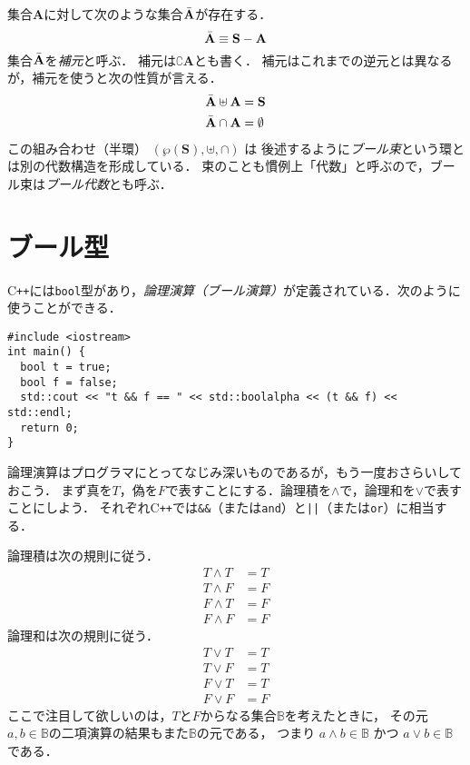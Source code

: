 \documentclass{jsbook}
\newcommand{\cxx}{\textrm{C}\texttt{++}}
\newcommand{\ccode}[1]{\texttt{#1}}
\newcommand{\keyword}[1]{\emph{#1}}
\newcommand{\bg}[1]{\mathbf{#1}}
\begin{document}
集合$\bg{A}$に対して次のような集合$\Bar{\bg{A}}$が存在する．
\begin{equation}
\Bar{\bg{A}}\equiv\bg{S}-\bg{A}
\end{equation}
集合$\Bar{\bg{A}}$を\keyword{補元}と呼ぶ．
補元は$\complement\bg{A}$とも書く．
補元はこれまでの逆元とは異なるが，補元を使うと次の性質が言える．
\begin{align}
\Bar{\bg{A}}\uplus\bg{A}&=\bg{S}\\
\Bar{\bg{A}}\cap\bg{A}&=\emptyset
\end{align}
この組み合わせ（半環） $(\wp(\bg{S}),\uplus,\cap)$ は
後述するように\keyword{ブール束}という環とは別の代数構造を形成している．
束のことも慣例上「代数」と呼ぶので，ブール束は\keyword{ブール代数}とも呼ぶ．

\section{ブール型}

\cxx には\ccode{bool}型があり，\keyword{論理演算（ブール演算）}が定義されている．次のように使うことができる．
\begin{verbatim}
#include <iostream>
int main() {
  bool t = true;
  bool f = false;
  std::cout << "t && f == " << std::boolalpha << (t && f) << std::endl;
  return 0;
}
\end{verbatim}

論理演算はプログラマにとってなじみ深いものであるが，もう一度おさらいしておこう．
まず真を$T$，偽を$F$で表すことにする．論理積を$\wedge$で，論理和を$\vee$で表すことにしよう．
それぞれ\cxx では\ccode{\&\&}（または\ccode{and}）と\ccode{||}（または\ccode{or}）に相当する．

論理積は次の規則に従う．
\begin{align}
T\wedge T&=T\\
T\wedge F&=F\\
F\wedge T&=F\\
F\wedge F&=F
\end{align}
論理和は次の規則に従う．
\begin{align}
T\vee T&=T\\
T\vee F&=T\\
F\vee T&=T\\
F\vee F&=F
\end{align}
ここで注目して欲しいのは，$T$と$F$からなる集合$\mathbb{B}$を考えたときに，
その元$a,b\in\mathbb{B}$の二項演算の結果もまた$\mathbb{B}$の元である，
つまり $a\wedge b\in\mathbb{B}$ かつ $a\vee b\in\mathbb{B}$ である．
\end{document}
